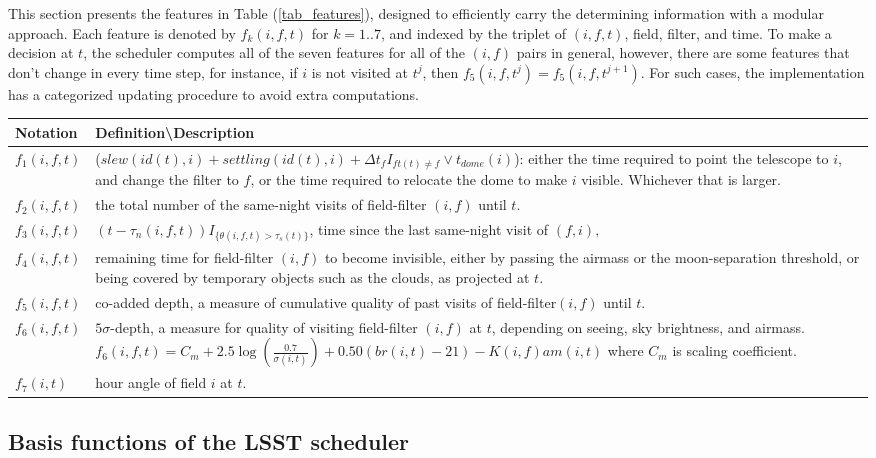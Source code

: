\documentclass[12pt,aas_macros]{article}
\theoremstyle{definition}
\begin{document}
This section presents the features in Table (\ref{tab_features}), designed to efficiently carry the determining information with a modular approach. Each feature is denoted by $f_k(i,f,t)$ for $k= 1..7$, and indexed by the triplet of $(i,f,t)$, field, filter, and time. To make a decision at $t$, the scheduler computes all of the seven features for all of the $(i,f)$ pairs in general, however, there are some features that don't change in every time step, for instance, if $i$ is not visited at $t^j$, then $f_5(i,f,t^j)= f_5(i,f,t^{j+1})$. For such cases, the implementation has a categorized updating procedure to avoid extra computations.


\begin{table}[h]
\begin{tabularx}{\textwidth}{| l | X |}
\hline
Notation & Definition\textbackslash Description\\ \hline \hline 
$f_1(i,f,t)$ & ($slew(id(t),i)+settling(id(t),i)+\Delta t_{f} I_{ft(t) \neq f} \vee t_{dome}(i)$): either the time required to point the telescope to $i$, and change the filter to $f$, or the time required to relocate the dome to make $i$ visible. Whichever that is larger.\\ \hline
$f_2(i,f,t)$ &  the total number of the same-night visits of field-filter $(i,f)$ until $t$.\\ \hline
$f_3(i,f,t)$ &  $(t - \tau_n(i,f,t)) I_{\{\theta(i,f,t) > \tau_s(t)\}}$, time since the last same-night visit of $(f,i),$\\ \hline
$f_4(i,f,t)$ &  remaining time for field-filter $(i,f)$ to become invisible, either by passing the airmass or the moon-separation threshold, or being covered by temporary objects such as the clouds, as projected at $t$.\\ \hline
$f_5(i,f,t)$ &  co-added depth, a measure of cumulative quality of past visits of field-filter$(i,f)$ until $t$.\\ \hline
$f_6(i,f,t)$ &  $5\sigma$-depth, a measure for quality of visiting field-filter $(i,f)$ at $t$, depending on seeing, sky brightness, and airmass. $f_6(i,f,t) = C_m + 2.5 \log (\frac{0.7}{\sigma(i,t)}) + 0.50 (br(i,t)-21) - K(i,f) am(i,t)$ where $C_m$ is scaling coefficient.\\ \hline
$f_7(i,t)$  & hour angle of field $i$ at $t$.\\ \hline
\hline
\end{tabularx}
\end{table}\label{tab_features}

\subsection{Basis functions of the LSST scheduler}\label{sec_lsst_bfs}
\end{document}
